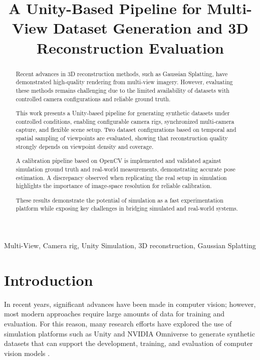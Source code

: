 \documentclass[conference]{IEEEtran}
\begin{document}
\title{A Unity-Based Pipeline for Multi-View Dataset Generation and 3D Reconstruction Evaluation\\}


\author{
}


\maketitle

\begin{abstract}
Recent advances in 3D reconstruction methods, such as Gaussian Splatting, have demonstrated high-quality rendering from multi-view imagery. However, evaluating these methods remains challenging due to the limited availability of datasets with controlled camera configurations and reliable ground truth.

This work presents a Unity-based pipeline for generating synthetic datasets under controlled conditions, enabling configurable camera rigs, synchronized multi-camera capture, and flexible scene setup. Two dataset configurations based on temporal and spatial sampling of viewpoints are evaluated, showing that reconstruction quality strongly depends on viewpoint density and coverage.

A calibration pipeline based on OpenCV is implemented and validated against simulation ground truth and real-world measurements, demonstrating accurate pose estimation. A discrepancy observed when replicating the real setup in simulation highlights the importance of image-space resolution for reliable calibration.

These results demonstrate the potential of simulation as a fast experimentation platform while exposing key challenges in bridging simulated and real-world systems.
\end{abstract}

\begin{IEEEkeywords}
Multi-View, Camera rig, Unity Simulation, 3D reconstruction, Gaussian Splatting
\end{IEEEkeywords}

\section{Introduction}
In recent years, significant advances have been made in computer vision; however, most modern approaches require large amounts of data for training and evaluation. For this reason, many research efforts have explored the use of simulation platforms such as Unity and NVIDIA Omniverse to generate synthetic datasets that can support the development, training, and evaluation of computer vision models \cite{unitySynthetic,synthetic}.
\end{document}
